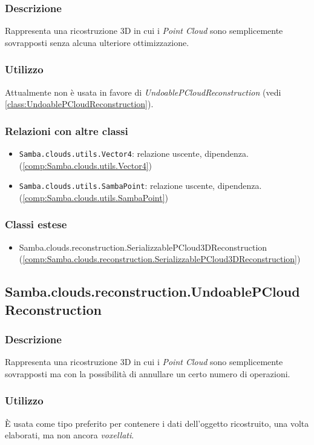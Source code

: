 \subsubsection{Descrizione}
Rappresenta una ricostruzione 3D in cui i \emph{Point Cloud} sono semplicemente sovrapposti senza alcuna ulteriore ottimizzazione.
\subsubsection{Utilizzo}
Attualmente non è usata in favore di \emph{UndoablePCloudReconstruction} (vedi \ref{class:UndoablePCloudReconstruction}).
\subsubsection{Relazioni con altre classi}
\begin{itemize}
	\item \texttt{Samba.clouds.utils.Vector4}: relazione uscente, dipendenza. (\ref{comp:Samba.clouds.utils.Vector4})
	\item \texttt{Samba.clouds.utils.SambaPoint}: relazione uscente, dipendenza. (\ref{comp:Samba.clouds.utils.SambaPoint})
\end{itemize}
\subsubsection{Classi estese}
\begin{itemize}
	\item Samba.clouds.reconstruction.SerializzablePCloud3DReconstruction (\ref{comp:Samba.clouds.reconstruction.SerializzablePCloud3DReconstruction})
\end{itemize}

\subsection{Samba.clouds.reconstruction.UndoablePCloudReconstruction}\label{comp:Samba.clouds.reconstruction.UndoablePCloudReconstruction}
\label{class:UndoablePCloudReconstruction}
\subsubsection{Descrizione}
Rappresenta una ricostruzione 3D in cui i \emph{Point Cloud} sono semplicemente sovrapposti ma con la possibilità di annullare un certo numero di operazioni.
\subsubsection{Utilizzo}
È usata come tipo preferito per contenere i dati dell'oggetto ricostruito, una volta elaborati, ma non ancora \emph{voxellati}.
